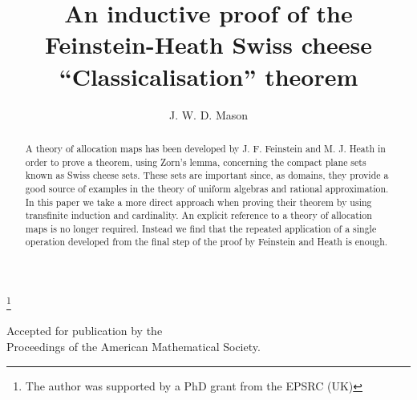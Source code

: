 \documentclass{strippedproc-l}
\theoremstyle{definition}
\theoremstyle{remark}
\numberwithin{equation}{section}
\begin{document}
\title[An inductive proof of the Swiss cheese ``Classicalisation'' theorem]{An inductive proof of the Feinstein-Heath Swiss cheese ``Classicalisation'' theorem}

\author{J. W. D. Mason}
\address{School of Mathematical Sciences, University of Nottingham, Nottingham, NG7 2RD, UK}
\thanks{The author was supported by a PhD grant from the EPSRC (UK)}



\begin{abstract}
A theory of allocation maps has been developed by J. F. Feinstein and M. J. Heath in order to prove a theorem, using Zorn's lemma, concerning the compact plane sets known as Swiss cheese sets.  These sets are important since, as domains, they provide a good source of examples in the theory of uniform algebras and rational approximation.  In this paper we take a more direct approach when proving their theorem by using transfinite induction and cardinality.  An explicit reference to a theory of allocation maps is no longer required.  Instead we find that the repeated application of a single operation developed from the final step of the proof by Feinstein and Heath is enough.
\end{abstract}

\maketitle
\begin{center}
Accepted for publication by the\\ 
Proceedings of the American Mathematical Society.
\end{center}
\end{document}
